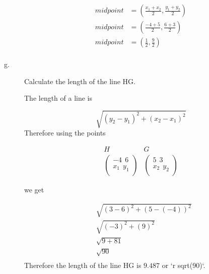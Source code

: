 \documentclass{article}
\begin{document}
\begin{description}
        $$
            \begin{aligned}
                midpoint & = (\frac{x_1 + x_2}{2}, \frac{y_1+y_2}{2}) \\
                midpoint & = (\frac{-4 + 5}{2}, \frac{6+3}{2})        \\
                midpoint & = (\frac{1}{2}, \frac{9}{2})               \\
            \end{aligned}
        $$

    \item[g.] \begin{large}Calculate the length of the line HG.\end{large}

        The length of a line is

        $$
            \sqrt{(y_2-y_1)^2 + (x_2-x_1)^2}
        $$
        Therefore using the points

        $$
            \begin{array}{c}
                H \\
                \begin{pmatrix}
                    -4 \ \ 6    \\
                    x_1 \ \ y_1 \\
                \end{pmatrix}
            \end{array}
            \begin{array}{c}
                G \\
                \begin{pmatrix}
                    5 \ \ 3     \\
                    x_2 \ \ y_2 \\
                \end{pmatrix}
            \end{array}
        $$

        we get

        $$
            \begin{aligned}
                 & \sqrt{(3-6)^2 + (5-(-4))^2} \\
                 & \sqrt{(-3)^2 + (9)^2}       \\
                 & \sqrt{9 + 81}               \\
                 & \sqrt{90}                   \\
                 &\end{aligned}
        $$
        Therefore the length of the line HG is $9.487$ or `r sqrt(90)`.
\end{description}
\end{document}

